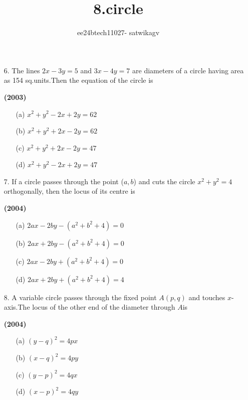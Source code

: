 \documentclass[journal,12pt,twocolumn]{IEEEtran}
\theoremstyle{remark}
\begin{document}

\vspace{3cm}

\title{8.circle}
\author{ee24btech11027- satwikagv}
\maketitle
\newpage
\bigskip

\renewcommand{\thefigure}{\theenumi}
\renewcommand{\thetable}{\theenumi}
\begin{enumerate}
\item[6.]The lines $2x-3y=5$ and $3x-4y=7$ are diameters of a circle having area as 154 sq.units.Then the equation of the circle is

\hfill{\textbf{(2003)}}

\begin{enumerate}
\item[(a)] $x^2+y^2-2x+2y=62$
\item[(b)] $x^2+y^2+2x-2y=62$
\item[(c)] $x^2+y^2+2x-2y=47$
\item[(d)] $x^2+y^2-2x+2y=47$
\end{enumerate}
\end{enumerate}
\begin{enumerate}
\item[7.]If a circle passes through the point ($a,b$) and cuts the circle $x^2+y^2=4$ orthogonally, then the locus of its centre is

\hfill{\textbf{(2004)}}

\begin{enumerate}
\item[(a)] $2ax-2by-(a^2+b^2+4)=0$
\item[(b)] $2ax+2by-(a^2+b^2+4)=0$
\item[(c)] $2ax-2by+(a^2+b^2+4)=0$
\item[(d)] $2ax+2by+(a^2+b^2+4)=4$
\end{enumerate}
\end{enumerate}
\begin{enumerate}
\item[8.]A variable circle passes through the fixed point $A(p,q)$ and touches $x$-axis.The locus of the other end of the diameter through $A$is

\hfill{\textbf{(2004)}}

\begin{enumerate}
\item[(a)] $(y-q)^2=4px$
\item[(b)] $(x-q)^2=4py$ 
\item[(c)] $(y-p)^2=4qx$
\item[(d)] $(x-p)^2=4qy$
\end{enumerate}
\end{enumerate}
\end{document}
